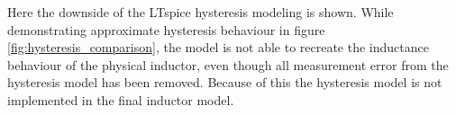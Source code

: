 Here the downside of the LTspice hysteresis modeling is shown. While demonstrating approximate hysteresis behaviour in figure \ref{fig:hysteresis_comparison}, the model is not able to recreate the inductance behaviour of the physical inductor, even though all measurement error from the hysteresis model has been removed. Because of this the hysteresis model is not implemented in the final inductor model.
